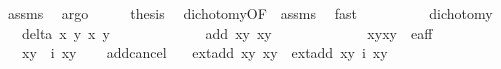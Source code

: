 \begin{isabellebody}
\ assms{\isacharparenleft}{}{\isacharparenright}\ \isamarkupfalse%
\ argo\isanewline
\ \ \isamarkupfalse%
\ \isamarkupfalse%
\ {\isacharquery}thesis\ \isamarkupfalse%
\ dichotomy{\isacharunderscore}{}{\isacharbrackleft}OF\ {\isacharunderscore}\ assms{\isacharparenleft}{}{\isacharparenright}{\isacharbrackright}\ \isamarkupfalse%
\ fast\isanewline
{}\isamarkupfalse%
%
\endisatagproof
{\isafoldproof}%
%
\isadelimproof
\isanewline
%
\endisadelimproof
\ \ \ \ \ \ \ \ \isanewline
\isanewline
\isanewline
{}\isamarkupfalse%
\ dichotomy{\isacharunderscore}{}{\isacharcolon}\isanewline
\ \ \ {\isachardoublequoteopen}delta{\isacharprime}\ x{}\ y{}\ x{}\ y{}\ {\isasymnoteq}\ {}{\isachardoublequoteclose}\ \isanewline
\ \ \ \ \ \ \ \ \ \ {\isachardoublequoteopen}add\ {\isacharparenleft}x{}{\isacharcomma}y{}{\isacharparenright}\ {\isacharparenleft}x{}{\isacharcomma}y{}{\isacharparenright}\ {\isacharequal}\ {\isacharparenleft}{}{\isacharcomma}{}{\isacharparenright}{\isachardoublequoteclose}\ \isanewline
\ \ \ \ \ \ \ \ \ \ {\isachardoublequoteopen}{\isacharparenleft}{\isacharparenleft}x{}{\isacharcomma}y{}{\isacharparenright}{\isacharcomma}{\isacharparenleft}x{}{\isacharcomma}y{}{\isacharparenright}{\isacharparenright}\ {\isasymin}\ e{\isacharunderscore}aff{\isacharunderscore}{}{\isachardoublequoteclose}\isanewline
\ \ \ {\isachardoublequoteopen}{\isacharparenleft}x{}{\isacharcomma}y{}{\isacharparenright}\ {\isacharequal}\ i\ {\isacharparenleft}x{}{\isacharcomma}y{}{\isacharparenright}{\isachardoublequoteclose}\isanewline
%
\isadelimproof
\ \ %
\endisadelimproof
%
\isatagproof
{}\isamarkupfalse%
%
\endisatagproof
{\isafoldproof}%
%
\isadelimproof
\isanewline
%
\endisadelimproof
\isanewline
{}\isamarkupfalse%
\ add{\isacharunderscore}cancel{\isacharunderscore}{}{\isacharcolon}\isanewline
\ \ \ {\isachardoublequoteopen}ext{\isacharunderscore}add\ {\isacharparenleft}x{}{\isacharcomma}y{}{\isacharparenright}\ {\isacharparenleft}x{}{\isacharcomma}y{}{\isacharparenright}\ {\isacharequal}\ ext{\isacharunderscore}add\ {\isacharparenleft}x{}{\isacharcomma}y{}{\isacharparenright}\ {\isacharparenleft}i\ {\isacharparenleft}x{}{\isacharcomma}y{}{\isacharparenright}{\isacharparenright}{\isachardoublequoteclose}\isanewline

\end{isabellebody}
